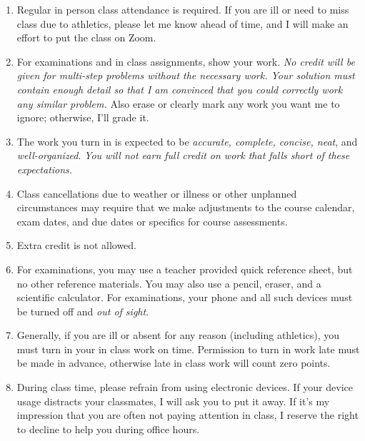 \documentclass[12pt]{article}
\newcounter{ex}\setcounter{ex}{0}
\begin{document}
\begin{enumerate}

\item Regular in person class attendance is required. If you are ill or need to miss class due to athletics, please let me know ahead of time, and I will make an effort to put the class on Zoom.

\item For examinations and in class assignments, show your work.  \emph{No credit will be given for multi-step problems without the necessary work. Your solution must contain enough detail
so that I am convinced that you could correctly work any similar problem.} Also erase or clearly mark any work you want me to ignore; otherwise,
I'll grade it.  

\item The work you turn in is expected to be \emph{accurate, 
complete, concise, neat}, and \emph{well-organized}.  
\emph{You will not earn full credit on work that falls short of 
these expectations.}

\item Class cancellations due to weather or illness or other 
unplanned circumstances may require that we make  adjustments
to the course calendar, exam dates, and due dates or specifics for 
course assessments. 


\item Extra credit is not allowed. 



\item For examinations, you may use a teacher provided quick reference sheet, 
but no other reference materials. You may also use a pencil, eraser, 
and a scientific calculator. For examinations, your phone and all such
devices must be turned off and \emph{out of sight}. 

\item Generally, if you are ill or absent for any reason (including 
athletics), you must turn in your in class work on time. Permission to
turn in work late must be made in advance, otherwise late in class work 
will count zero points.


 

\item During class time, please refrain from using electronic devices. If your 
device usage distracts your classmates, I will ask you to put it away. If it's my 
impression that you are often not paying attention in class, I reserve the right to 
decline to help you during office hours.


\end{enumerate}
\end{document}
